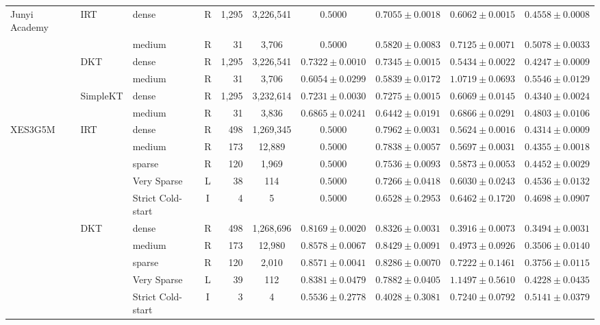 \begin{table}[tbp]
{\begin{tabular}{lllcrccccc}
\midrule
Junyi Academy & IRT & dense & R & 1,295 & 3,226,541 & $0.5000$ & $0.7055 \pm 0.0018$ & $0.6062 \pm 0.0015$ & $0.4558 \pm 0.0008$ \\
 &  & medium & R & 31 & 3,706 & $0.5000$ & $0.5820 \pm 0.0083$ & $0.7125 \pm 0.0071$ & $0.5078 \pm 0.0033$ \\
 & DKT & dense & R & 1,295 & 3,226,541 & $0.7322 \pm 0.0010$ & $0.7345 \pm 0.0015$ & $0.5434 \pm 0.0022$ & $0.4247 \pm 0.0009$ \\
 &  & medium & R & 31 & 3,706 & $0.6054 \pm 0.0299$ & $0.5839 \pm 0.0172$ & $1.0719 \pm 0.0693$ & $0.5546 \pm 0.0129$ \\
 & SimpleKT & dense & R & 1,295 & 3,232,614 & $0.7231 \pm 0.0030$ & $0.7275 \pm 0.0015$ & $0.6069 \pm 0.0145$ & $0.4340 \pm 0.0024$ \\
 &  & medium & R & 31 & 3,836 & $0.6865 \pm 0.0241$ & $0.6442 \pm 0.0191$ & $0.6866 \pm 0.0291$ & $0.4803 \pm 0.0106$ \\
\midrule
XES3G5M & IRT & dense & R & 498 & 1,269,345 & $0.5000$ & $0.7962 \pm 0.0031$ & $0.5624 \pm 0.0016$ & $0.4314 \pm 0.0009$ \\
 &  & medium & R & 173 & 12,889 & $0.5000$ & $0.7838 \pm 0.0057$ & $0.5697 \pm 0.0031$ & $0.4355 \pm 0.0018$ \\
 &  & sparse & R & 120 & 1,969 & $0.5000$ & $0.7536 \pm 0.0093$ & $0.5873 \pm 0.0053$ & $0.4452 \pm 0.0029$ \\
 &  & Very Sparse & L & 38 & 114 & $0.5000$ & $0.7266 \pm 0.0418$ & $0.6030 \pm 0.0243$ & $0.4536 \pm 0.0132$ \\
 &  & Strict Cold-start & I & 4 & 5 & $0.5000$ & $0.6528 \pm 0.2953$ & $0.6462 \pm 0.1720$ & $0.4698 \pm 0.0907$ \\
 & DKT & dense & R & 498 & 1,268,696 & $0.8169 \pm 0.0020$ & $0.8326 \pm 0.0031$ & $0.3916 \pm 0.0073$ & $0.3494 \pm 0.0031$ \\
 &  & medium & R & 173 & 12,980 & $0.8578 \pm 0.0067$ & $0.8429 \pm 0.0091$ & $0.4973 \pm 0.0926$ & $0.3506 \pm 0.0140$ \\
 &  & sparse & R & 120 & 2,010 & $0.8571 \pm 0.0041$ & $0.8286 \pm 0.0070$ & $0.7222 \pm 0.1461$ & $0.3756 \pm 0.0115$ \\
 &  & Very Sparse & L & 39 & 112 & $0.8381 \pm 0.0479$ & $0.7882 \pm 0.0405$ & $1.1497 \pm 0.5610$ & $0.4228 \pm 0.0435$ \\
 &  & Strict Cold-start & I & 3 & 4 & $0.5536 \pm 0.2778$ & $0.4028 \pm 0.3081$ & $0.7240 \pm 0.0792$ & $0.5141 \pm 0.0379$ \\

\end{tabular}}
\end{table}
